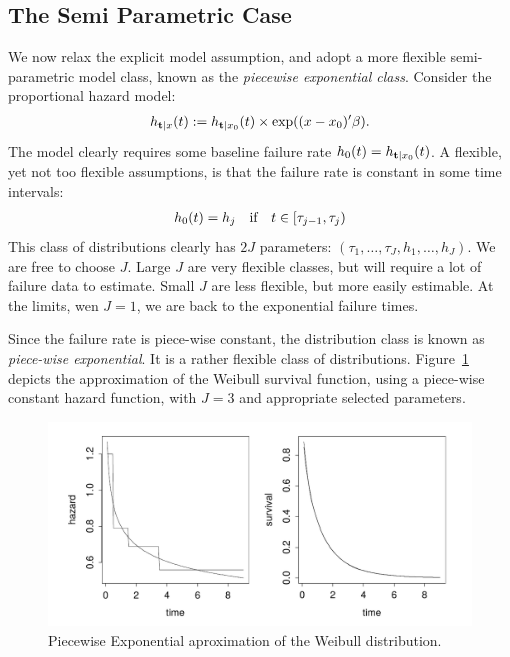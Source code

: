\subsection{The Semi Parametric Case}
We now relax the explicit model assumption, and adopt a more flexible semi-parametric model class, known as the \emph{piecewise exponential class}.
Consider the proportional hazard model:
\begin{align}
	h_{\mathbf{t}|x} (t):=h_{\mathbf{t}|x_0} (t) \times \exp((x-x_0)'\beta).
\end{align}
The model clearly requires some baseline failure rate $h_{0} (t)=h_{\mathbf{t}|x_0} (t)$.
A flexible, yet not too flexible assumptions, is that the failure rate is constant in some time intervals:
\begin{align}
	h_{0} (t)=h_j \quad \text{if} \quad t\in [\tau_{j-1},\tau_j)
\end{align}
This class of distributions clearly has $2J$ parameters: $(\tau_1,\dots,\tau_J,h_1,\dots,h_J)$.
We are free to choose $J$. Large $J$ are very flexible classes, but will require a lot of failure data to estimate.
Small $J$ are less flexible, but more easily estimable. At the limits, wen $J=1$, we are back to the exponential failure times. 

Since the failure rate is piece-wise constant, the distribution class is known as \emph{piece-wise exponential}.
It is a rather flexible class of distributions. Figure~\ref{fig:piecewise_exponential} depicts the approximation of the Weibull survival function, using a piece-wise constant hazard function, with $J=3$ and appropriate selected parameters.
\begin{figure}[ht]
\centering
\includegraphics[height=0.2\textheight]{art/piecewise_exponential}
\caption{Piecewise Exponential aproximation of the Weibull distribution.}
\label{fig:piecewise_exponential}
\end{figure}





